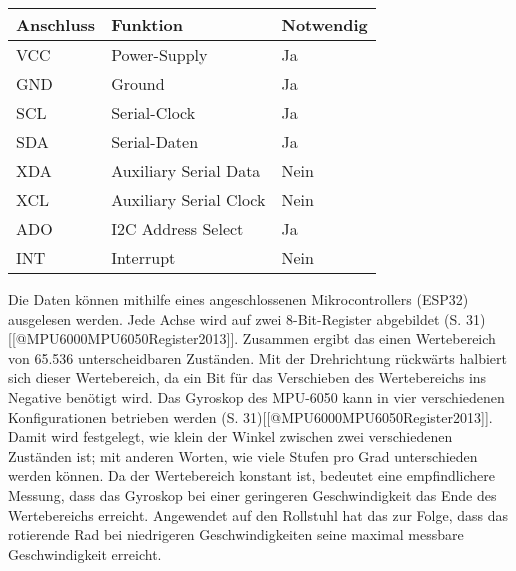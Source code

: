 \begin{table}[h]
    \centering
    \begin{tabular}{|l|l|l|}
        \hline
        Anschluss & Funktion               & Notwendig \\ \hline
        VCC       & Power-Supply           & Ja        \\ \hline
        GND       & Ground                 & Ja        \\ \hline
        SCL       & Serial-Clock           & Ja        \\ \hline
        SDA       & Serial-Daten           & Ja        \\ \hline
        XDA       & Auxiliary Serial Data  & Nein      \\ \hline
        XCL       & Auxiliary Serial Clock & Nein      \\ \hline
        ADO       & I2C Address Select     & Ja        \\ \hline
        INT       & Interrupt              & Nein      \\ \hline
    \end{tabular}
\end{table}

Die Daten können mithilfe eines angeschlossenen Mikrocontrollers (ESP32) ausgelesen werden.
Jede Achse wird auf zwei 8-Bit-Register abgebildet (S. 31)[[@MPU6000MPU6050Register2013]].
Zusammen ergibt das einen Wertebereich von 65.536 unterscheidbaren Zuständen.
Mit der Drehrichtung rückwärts halbiert sich dieser Wertebereich, da ein Bit für das Verschieben des Wertebereichs ins Negative benötigt wird.
Das Gyroskop des MPU-6050 kann in vier verschiedenen Konfigurationen betrieben werden (S. 31)[[@MPU6000MPU6050Register2013]].
Damit wird festgelegt, wie klein der Winkel zwischen zwei verschiedenen Zuständen ist; mit anderen Worten, wie viele Stufen pro Grad unterschieden werden können.
Da der Wertebereich konstant ist, bedeutet eine empfindlichere Messung, dass das Gyroskop bei einer geringeren Geschwindigkeit das Ende des Wertebereichs erreicht.
Angewendet auf den Rollstuhl hat das zur Folge, dass das rotierende Rad bei niedrigeren Geschwindigkeiten seine maximal messbare Geschwindigkeit erreicht.

